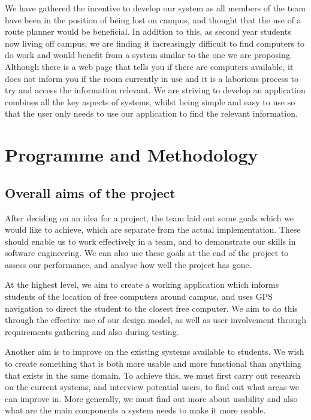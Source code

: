 \documentclass[10pt,a4paper,oneside]{report}
\begin{document}
We have gathered the incentive to develop our system as all members of the team have been in the position of being lost on campus, and thought that the use of a route planner would be beneficial. In addition to this, as second year students now living off campus, we are finding it increasingly difficult to find computers to do work and would benefit from a system similar to the one we are proposing.  Although there is a web page that tells you if there are computers available, it does not inform you if the room currently in use and it is a laborious process to try and access the information relevant. We are striving to develop an application combines all the key aspects of systems, whilst being simple and easy to use so that the user only needs to use our application to find the relevant information.

\clearpage
\section*{Programme and Methodology}
\subsection*{Overall aims of the project}
After deciding on an idea for a project, the team laid out some goals which we would like to achieve, which are separate from the actual implementation. These should enable us to work effectively in a team, and to demonstrate our skills in software engineering. We can also use these goals at the end of the project to assess our performance, and analyse how well the project has gone.

At the highest level, we aim to create a working application which informs students of the location of free computers around campus, and uses GPS navigation to direct the student to the closest free computer. We aim to do this through the effective use of our design model, as well as user involvement through requirements gathering and also during testing.

Another aim is to improve on the existing systems available to students. We wish to create something that is both more usable and more functional than anything that exists in the same domain. To achieve this, we must first carry out research on the current systems, and interview potential users, to find out what areas we can improve in. More generally, we must find out more about usability and also what are the main components a system needs to make it more usable.
\end{document}
